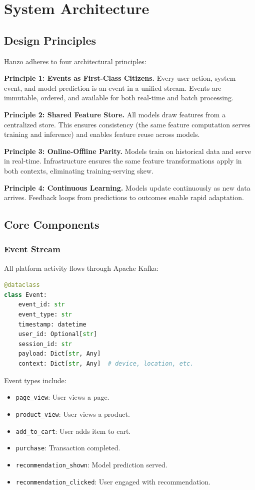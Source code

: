 \section{System Architecture}


\subsection{Design Principles}

Hanzo adheres to four architectural principles:

\textbf{Principle 1: Events as First-Class Citizens.} Every user action, system event, and model prediction is an event in a unified stream. Events are immutable, ordered, and available for both real-time and batch processing.

\textbf{Principle 2: Shared Feature Store.} All models draw features from a centralized store. This ensures consistency (the same feature computation serves training and inference) and enables feature reuse across models.

\textbf{Principle 3: Online-Offline Parity.} Models train on historical data and serve in real-time. Infrastructure ensures the same feature transformations apply in both contexts, eliminating training-serving skew.

\textbf{Principle 4: Continuous Learning.} Models update continuously as new data arrives. Feedback loops from predictions to outcomes enable rapid adaptation.

\subsection{Core Components}

\subsubsection{Event Stream}

All platform activity flows through Apache Kafka:

\begin{lstlisting}[language=Python,caption=Event schema]
@dataclass
class Event:
    event_id: str
    event_type: str
    timestamp: datetime
    user_id: Optional[str]
    session_id: str
    payload: Dict[str, Any]
    context: Dict[str, Any]  # device, location, etc.
\end{lstlisting}

Event types include:
\begin{itemize}
\item \texttt{page\_view}: User views a page.
\item \texttt{product\_view}: User views a product.
\item \texttt{add\_to\_cart}: User adds item to cart.
\item \texttt{purchase}: Transaction completed.
\item \texttt{recommendation\_shown}: Model prediction served.
\item \texttt{recommendation\_clicked}: User engaged with recommendation.
\end{itemize}

